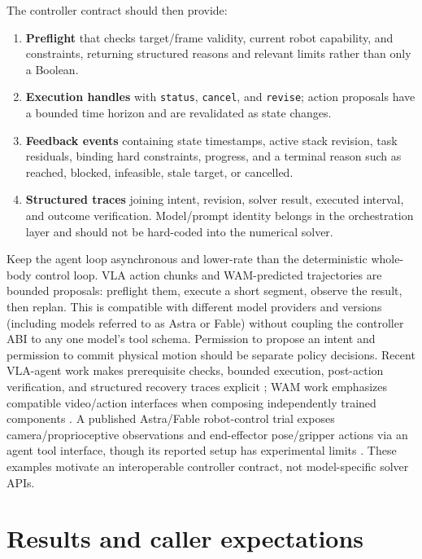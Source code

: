 \documentclass[11pt]{article}
\begin{document}
The controller contract should then provide:
\begin{enumerate}[leftmargin=*,nosep]
  \item \textbf{Preflight} that checks target/frame validity, current robot
        capability, and constraints, returning structured reasons and
        relevant limits rather than only a Boolean.
  \item \textbf{Execution handles} with \texttt{status}, \texttt{cancel},
        and \texttt{revise}; action proposals have a bounded time horizon and
        are revalidated as state changes.
  \item \textbf{Feedback events} containing state timestamps, active stack
        revision, task residuals, binding hard constraints, progress, and a
        terminal reason such as reached, blocked, infeasible, stale target,
        or cancelled.
  \item \textbf{Structured traces} joining intent, revision, solver result,
        executed interval, and outcome verification. Model/prompt identity
        belongs in the orchestration layer and should not be hard-coded into
        the numerical solver.
\end{enumerate}

Keep the agent loop asynchronous and lower-rate than the deterministic
whole-body control loop. VLA action chunks and WAM-predicted trajectories are
bounded proposals: preflight them, execute a short segment, observe the
result, then replan. This is compatible with different model providers and
versions (including models referred to as Astra or Fable) without coupling
the controller ABI to any one model's tool schema. Permission to propose an
intent and permission to commit physical motion should be separate policy
decisions. Recent VLA-agent work makes prerequisite checks, bounded execution,
post-action verification, and structured recovery traces explicit
\cite{embodiedskills2026}; WAM work emphasizes compatible video/action
interfaces when composing independently trained components
\cite{openwam2026}. A published Astra/Fable robot-control trial exposes
camera/proprioceptive observations and end-effector pose/gripper actions via
an agent tool interface, though its reported setup has experimental limits
\cite{robottoolapi2026}. These examples motivate an interoperable controller
contract, not model-specific solver APIs.

\section{Results and caller expectations}
\end{document}

